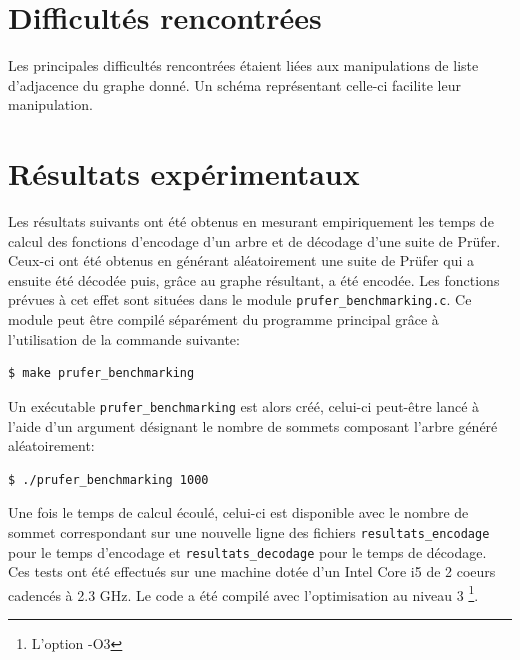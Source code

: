 \documentclass[a4paper, 11pt, oneside]{article}
\begin{document}
\section{Difficultés rencontrées}

Les principales difficultés rencontrées étaient liées aux manipulations de liste d'adjacence du graphe donné. Un schéma représentant celle-ci facilite leur manipulation.

\section{Résultats expérimentaux}

Les résultats suivants ont été obtenus en mesurant empiriquement les temps de calcul des fonctions d'encodage d'un arbre et de décodage d'une suite de Prüfer. Ceux-ci ont été obtenus en générant aléatoirement une suite de Prüfer qui a ensuite été décodée puis, grâce au graphe résultant, a été encodée. Les fonctions prévues à cet effet sont situées dans le module \texttt{prufer\_benchmarking.c}. Ce module peut être compilé séparément du programme principal grâce à l'utilisation de la commande suivante:

\begin{lstlisting}[language=bash]
$ make prufer_benchmarking 
\end{lstlisting}

Un exécutable \texttt{prufer\_benchmarking} est alors créé, celui-ci peut-être lancé à l'aide d'un argument désignant le nombre de sommets composant l'arbre généré aléatoirement:

\begin{lstlisting}[language=bash]
$ ./prufer_benchmarking 1000
\end{lstlisting}

Une fois le temps de calcul écoulé, celui-ci est disponible avec le nombre de sommet correspondant sur une nouvelle ligne des fichiers \texttt{resultats\_encodage} pour le temps d'encodage et \texttt{resultats\_decodage} pour le temps de décodage.\\

Ces tests ont été effectués sur une machine dotée d'un Intel Core i5 de 2 coeurs cadencés à 2.3 GHz. Le code a été compilé avec l'optimisation au niveau 3 \footnote{L'option -O3}.
\end{document}

